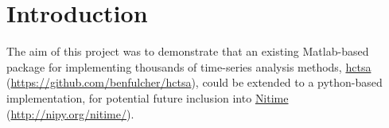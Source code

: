 \documentclass[twocolumn]{bmcart}%
\begin{document}
\begin{frontmatter}
\begin{fmbox}

	








%
\end{fmbox}%

\end{frontmatter}


\section{Introduction}\label{introduction}

The aim of this project was to demonstrate that an existing Matlab-based
package for implementing thousands of time-series analysis methods,
\href{https://github.com/benfulcher/hctsa}{hctsa}
(\url{https://github.com/benfulcher/hctsa}), could be extended to a
python-based implementation, for potential future inclusion into
\href{http://nipy.org/nitime/}{Nitime} (\url{http://nipy.org/nitime/}).
\end{document}

